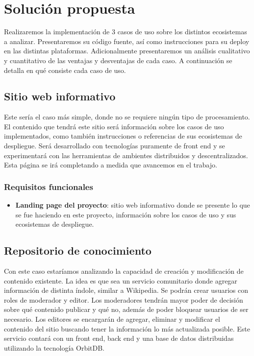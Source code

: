 \section{Solución propuesta}

Realizaremos la implementación de 3 casos de uso sobre los distintos ecosistemas a analizar. Presentaremos su código fuente, así como instrucciones para su deploy en las distintas plataformas. Adicionalmente presentaremos un análisis cualitativo y cuantitativo de las ventajas y desventajas de cada caso. A continuación se detalla en qué consiste cada caso de uso.

\subsection{Sitio web informativo}

Este sería el caso más simple, donde no se requiere ningún tipo de procesamiento. El contenido que tendrá este sitio será información sobre los casos de uso implementados, como también instrucciones o referencias de sus ecosistemas de despliegue. Será desarrollado con tecnologías puramente de front end y se experimentará con las herramientas de ambientes distribuidos y descentralizados. Esta página se irá completando a medida que avancemos en el trabajo.

\subsubsection{Requisitos funcionales}

\begin{itemize}
    \item \textbf{Landing page del proyecto}: sitio web informativo donde se presente lo que se fue haciendo en este proyecto, información sobre los casos de uso y sus ecosistemas de despliegue.
\end{itemize}

\subsection{Repositorio de conocimiento}

Con este caso estaríamos analizando la capacidad de creación y modificación de contenido existente. La idea es que sea un servicio comunitario donde agregar información de distinta índole, similar a Wikipedia. Se podrán crear usuarios con roles de moderador y editor. Los moderadores tendrán mayor poder de decisión sobre qué contenido publicar y qué no, además de poder bloquear usuarios de ser necesario. Los editores se encargarán de agregar, eliminar y modificar el contenido del sitio buscando tener la información lo más actualizada posible. Este servicio contará con un front end, back end y una base de datos distribuidas utilizando la tecnología OrbitDB.

